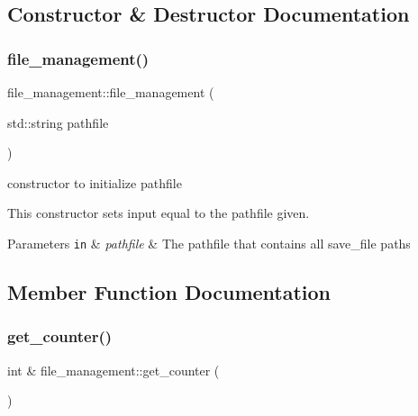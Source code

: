 \subsection{Constructor \& Destructor Documentation}
\mbox{\label{classfile__management_ae3d7ca2804b44e05efc2ddc79c9d514d}} 
\subsubsection{\texorpdfstring{file\+\_\+management()}{file\_management()}}
{\footnotesize\ttfamily file\+\_\+management\+::file\+\_\+management (\begin{DoxyParamCaption}\item[{std\+::string}]{pathfile }\end{DoxyParamCaption})}



constructor to initialize pathfile 

This constructor sets input equal to the pathfile given.


\begin{DoxyParams}[1]{Parameters}
\mbox{\tt in}  & {\em pathfile} & The pathfile that contains all save\+\_\+file paths \\
\hline
\end{DoxyParams}


\subsection{Member Function Documentation}
\mbox{\label{classfile__management_ae6291547fab57a5b861c52e970175854}} 
\subsubsection{\texorpdfstring{get\+\_\+counter()}{get\_counter()}}
{\footnotesize\ttfamily int \& file\+\_\+management\+::get\+\_\+counter (\begin{DoxyParamCaption}{ }\end{DoxyParamCaption})}



